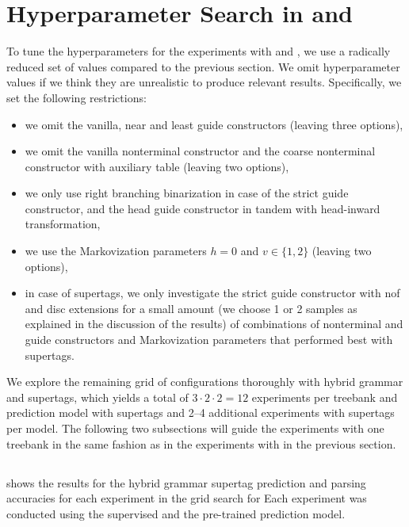 \documentclass[../../document.tex]{subfiles}
\begin{document}
    \section{Hyperparameter Search in   and }\label{sec:gridsearch:other}
    To tune the hyperparameters for the experiments with  and \tiger{}, we use a radically reduced set of values compared to the previous section.
    We omit hyperparameter values if we think they are unrealistic to produce relevant results.
    Specifically, we set the following restrictions:
    \begin{itemize}
        \item we omit the vanilla, near and least guide constructors (leaving three options),
        \item we omit the vanilla nonterminal constructor and the coarse nonterminal constructor with auxiliary table (leaving two options), 
        \item we only use right branching binarization in case of the strict guide constructor, and the head guide constructor in tandem with head-inward transformation,
        \item we use the Markovization parameters \(h = 0\) and \(v \in \{1,2\}\) (leaving two options),
        \item in case of  supertags, we only investigate the strict guide constructor with nof and disc extensions for a small amount (we choose 1 or 2 samples as explained in the discussion of the results) of combinations of nonterminal and guide constructors and Markovization parameters that performed best with  supertags.
    \end{itemize}

    We explore the remaining grid of configurations thoroughly with hybrid grammar and  supertags, which yields a total of $3 \cdot 2 \cdot 2 = 12$ experiments per treebank and prediction model with  supertags and 2--4 additional experiments with  supertags per model.
    The following two subsections will guide the experiments with one treebank in the same fashion as in the experiments with \negra{} in the previous section.

    \subsection{}
     shows the results for the hybrid grammar supertag prediction and parsing accuracies for each experiment in the grid search for 
    Each experiment was conducted using the supervised and the pre-trained prediction model.
    
\end{document}
